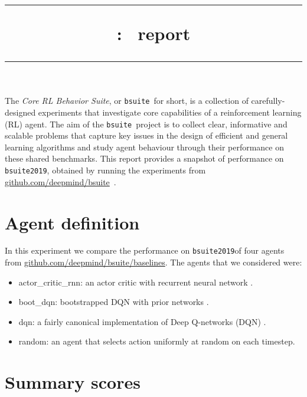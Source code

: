 \documentclass[11pt]{article}
\title{
\vspace{-20mm}
\rule{\linewidth}{4pt}
\vskip 1mm
\fullname: \shortname\ report
\vskip -6mm
\rule{\linewidth}{1pt}
\vskip -20mm
}
\date{}
\author{}
\newcommand{\fullname}{Core RL Behavior Suite}
\newcommand{\shortname}{\texttt{bsuite}}
\newcommand{\github}{\url{github.com/deepmind/bsuite}}
\newcommand{\version}{\texttt{bsuite2019}}
\begin{document}
\maketitle


{\small
\begin{adjustwidth}{1.5cm}{1.5cm}
The \textit{\fullname}, or \shortname\ for short, is a collection of carefully-designed experiments that investigate core capabilities of a reinforcement learning (RL) agent.
The aim of the \shortname\ project is to collect clear, informative and scalable problems that capture key issues in the design of efficient and general learning algorithms and study agent behaviour through their performance on these shared benchmarks.
This report provides a snapshot of performance on \version, obtained by running the experiments from \github\ \cite{osband2019bsuite}.
\end{adjustwidth}
}

\section{Agent definition}
In this experiment we compare the performance on \version of four agents
from \url{github.com/deepmind/bsuite/baselines}. The agents that we
considered were:
\vspace{-2mm}
\begin{itemize}[noitemsep, nolistsep]
    \item actor\_critic\_rnn: an actor critic with recurrent neural network \cite{mnih2016asynchronous}.
    \item boot\_dqn: bootstrapped DQN with prior networks \cite{osband2016deep,osband2018rpf}.
    \item dqn: a fairly canonical implementation of Deep Q-networks (DQN) \cite{mnih2015human}.
    \item random: an agent that selects action uniformly at random on each timestep.
\end{itemize}



\section{Summary scores}
\end{document}
